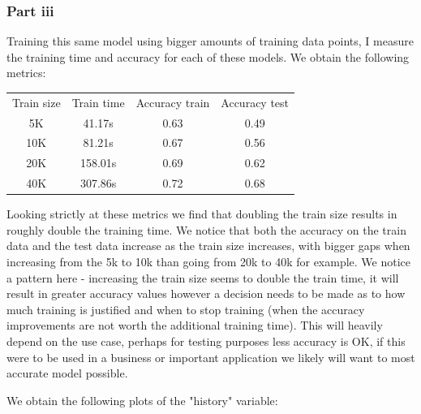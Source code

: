 \documentclass[10pt]{article}
\begin{document}
\subsubsection*{Part iii}
Training this same model using bigger amounts of training data
points, I measure the training time and accuracy for each of these
models. We obtain the following metrics:

\vspace{5mm} %
\begin{center} \begin{tabular}[h]{cccc}
    Train size & Train time & Accuracy train & Accuracy test  \\
    5K         & 41.17s     & 0.63           & 0.49            \\
    10K        & 81.21s     & 0.67           & 0.56            \\
    20K        & 158.01s    & 0.69           & 0.62            \\   
    40K        & 307.86s    & 0.72           & 0.68            \\
\end{tabular} \end{center}

Looking strictly at these metrics we find that doubling the train size
results in roughly double the training time. We notice that both the
accuracy on the train data and the test data increase as the train size increases,
with bigger gaps when increasing from the 5k to 10k than going from 20k to 40k for
example. We notice a pattern here - increasing the train size seems to double the train time,
it will result in greater accuracy values however a decision needs to be made as to
how much training is justified and when to stop training (when the accuracy improvements are
not worth the additional training time). This will heavily depend on the use case, 
perhaps for testing purposes less accuracy is OK, if this were to be used in a business
or important application we likely will want to most accurate model possible.

We obtain the following plots of the "history" variable: 
\end{document}
